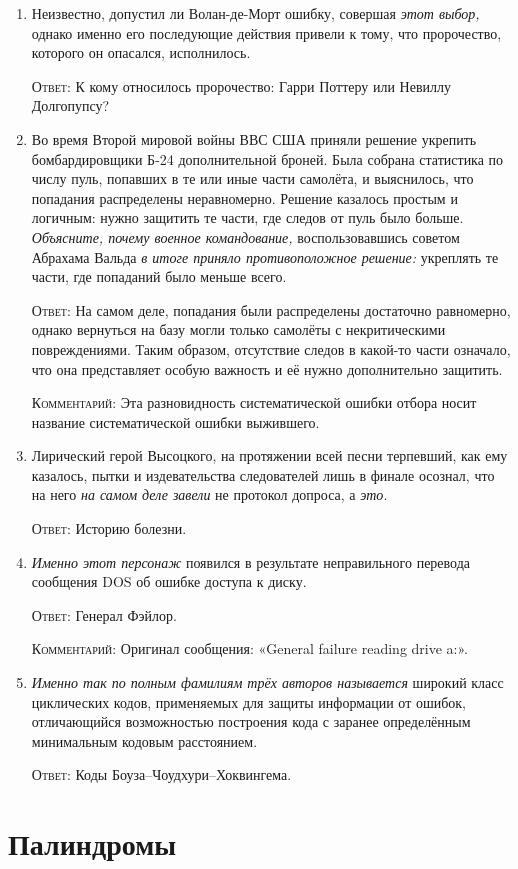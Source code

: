 \documentclass[a4paper,10pt]{article}
\let\keyword\textsc
\newenvironment{topic}{\begin{enumerate}}{\end{enumerate}}
\newcommand{\question}[3]{\item[#1.] #2 \par \keyword{Ответ:} #3}
\newcommand{\commentary}[1]{\par \keyword{Комментарий:} #1}
\begin{document}
\begin{topic}
 \question{10}{Неизвестно, допустил ли Волан-де-Морт ошибку, совершая \emph{этот выбор,} однако именно его последующие действия привели к тому, что пророчество, которого он опасался, исполнилось.}{К кому относилось пророчество: Гарри Поттеру или Невиллу Долгопупсу?}
 \question{20}{Во время Второй мировой войны ВВС США приняли решение укрепить бомбардировщики Б-24 дополнительной броней. Была собрана статистика по числу пуль, попавших в те или иные части самолёта, и выяснилось, что попадания распределены неравномерно. Решение казалось простым и логичным: нужно защитить те части, где следов от пуль было больше. \emph{Объясните, почему военное командование,} воспользовавшись советом Абрахама Вальда \emph{в итоге приняло противоположное решение:} укреплять те части, где попаданий было меньше всего.}{На самом деле, попадания были распределены достаточно равномерно, однако вернуться на базу могли только самолёты с некритическими повреждениями. Таким образом, отсутствие следов в какой-то части означало, что она представляет особую важность и её нужно дополнительно защитить.}\commentary{Эта разновидность систематической ошибки отбора носит название систематической ошибки выжившего.}
 \question{30}{Лирический герой Высоцкого, на протяжении всей песни терпевший, как ему казалось, пытки и издевательства следователей лишь в финале осознал, что на него \emph{на самом деле завели} не протокол допроса, а \emph{это.}}{Историю болезни.}
 \question{40}{\emph{Именно этот персонаж} появился в результате неправильного перевода сообщения DOS об ошибке доступа к диску.}{Генерал Фэйлор.}\commentary{Оригинал сообщения: «General failure reading drive a:».}
 \question{50}{\emph{Именно так по полным фамилиям трёх авторов называется} широкий класс циклических кодов, применяемых для защиты информации от ошибок, отличающийся возможностью построения кода с заранее определённым минимальным кодовым расстоянием.}{Коды Боуза–Чоудхури–Хоквингема.}
\end{topic}


\newpage
\section{Палиндромы}
\end{document}
